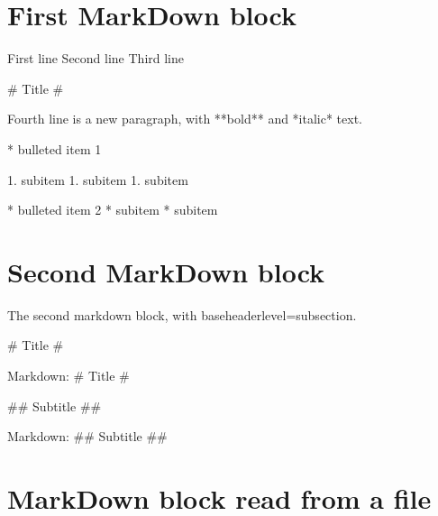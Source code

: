 \documentclass[12pt,english]{article}
\begin{document}
\section{First MarkDown block}

First line
Second line 
Third line

# Title #

Fourth line is a new paragraph, with **bold** and *italic* text.

* bulleted item 1

    1. subitem 
    1. subitem
    1. subitem

* bulleted item 2
    * subitem 
    * subitem

\stopmarkdown
 
\section{Second MarkDown block}


The second markdown block, with baseheaderlevel=subsection.

# Title #

    Markdown: # Title #

## Subtitle ##

    Markdown: ## Subtitle ##

\stopmarkdown

\section{MarkDown block read from a file}


\end{document}
